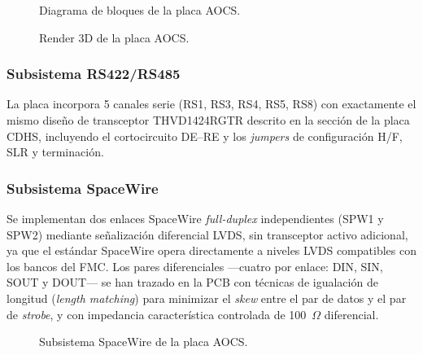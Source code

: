 \begin{figure}[H]
    \centering
    \caption{Diagrama de bloques de la placa AOCS.}
    \label{fig:aocs_top}
\end{figure}

\begin{figure}[H]
    \centering
    \caption{Render 3D de la placa AOCS.}
    \label{fig:aocs_3d}
\end{figure}

\subsubsection{Subsistema RS422/RS485}

La placa incorpora 5 canales serie (RS1, RS3, RS4, RS5, RS8) con exactamente el mismo
diseño de transceptor THVD1424RGTR descrito en la sección de la placa CDHS, incluyendo
el cortocircuito DE--RE y los \textit{jumpers} de configuración H/F, SLR y terminación.

\subsubsection{Subsistema SpaceWire}

Se implementan dos enlaces SpaceWire \textit{full-duplex} independientes (SPW1 y SPW2) mediante
señalización diferencial LVDS, sin transceptor activo adicional, ya que el estándar SpaceWire
opera directamente a niveles LVDS compatibles con los bancos del FMC. Los pares
diferenciales ---cuatro por enlace: DIN, SIN, SOUT y DOUT--- se han trazado en la PCB con
técnicas de igualación de longitud (\textit{length matching}) para minimizar el \textit{skew} entre el par
de datos y el par de \textit{strobe}, y con impedancia característica controlada de 100~$\Omega$
diferencial.

\begin{figure}[H]
    \centering
    \caption{Subsistema SpaceWire de la placa AOCS.}
    \label{fig:aocs_spw}
\end{figure}

